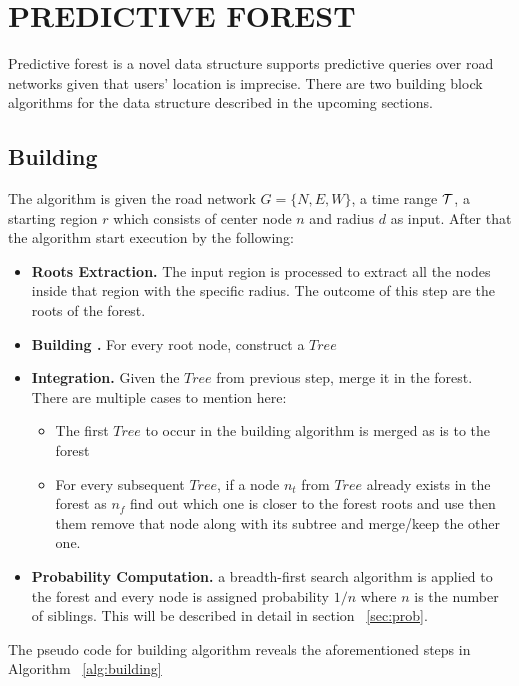\chapter{PREDICTIVE FOREST}
\label{sect:pforest}
Predictive forest is a novel data structure supports predictive queries over road networks given that users' location is imprecise. There are two building block algorithms for the \pf data structure described in the upcoming sections.

\section {Building \PF}
The algorithm is given the road network $G=\{N,E,W\}$, a time range $\cal T$, a starting region $r$ which consists of center node $n$ and radius $d$ as input. After that the algorithm start execution by the following:
\begin{itemize}
    \item {\bf Roots Extraction.} The input region is processed to extract all the nodes inside that region with the specific radius. The outcome of this step are the roots of the forest.
    \item {\bf Building \PT.} For every root node, construct a \pt $Tree$ \cite{Hendawi15}
    \item {\bf \PT Integration.} Given the $Tree$ from previous step, merge it in the forest. There are multiple cases to mention here:
    \begin{itemize}
        \item The first $Tree$ to occur in the building algorithm is merged as is to the forest
        \item For every subsequent $Tree$, if a node $n_t$ from $Tree$ already exists in the forest as $n_f$ find out which one is closer to the forest roots and use then them remove that node along with its subtree and merge/keep the other one.
    \end{itemize}
    \item {\bf Probability Computation.} a breadth-first search algorithm is applied to the forest and every node is assigned probability $1/n$ where $n$ is the number of siblings. This will be described in detail in section ~\ref{sec:prob}.
\end{itemize}

The pseudo code for \pf building algorithm reveals the aforementioned steps in Algorithm ~\ref{alg:building}

